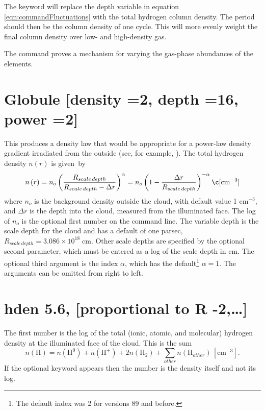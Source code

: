The keyword  will replace
the depth variable in equation \ref{eqn:commandFluctuations} with
the total hydrogen column density.
The period should then be the column
density of one cycle.
This will more evenly weight the final column density
over low- and high-density gas.

The  command proves a mechanism
for varying the gas-phase abundances of the elements.

\section{Globule [density =2, depth =16, power =2]}

This produces a density law that would be appropriate for a power-law
density gradient irradiated from the outside (see, for example, \citealp{Williams1992}).  The total hydrogen density $n(r)$ is given~by
\begin{equation}
n\left( r \right) = n_{\mathrm{o}} \left( {\frac{{R_{scale\,depth}
}}{{R_{scale\,depth}  - \Delta r}}} \right)^\alpha   = n_o \left( {1 -
\frac{{\Delta r}}{{R_{scale\,depth} }}} \right)^{ - \alpha }
\c[\mathrm{cm}^{-3}]%
\end{equation}
where $n_o$ is the background density outside the cloud,
with default value
1 cm$^{-3}$, and $\Delta r$ is the depth into the cloud,
measured from the illuminated face.
The log of $n_o$ is the optional first number on the command line.
The variable  depth is the scale depth
for the cloud and has a default
of one parsec, $R_{scale\, depth} = 3.086\times 10^{18} \; \mathrm{cm}$.
Other scale depths are specified
by the optional second parameter, which must be entered as a log of the
scale depth in cm.
The optional third argument is the index $\alpha$, which has
the default\footnote{The default index was 2 for versions 89 and before.} $\alpha = 1$. The arguments can be omitted from right to left.

\section{hden 5.6, [proportional to R -2,\dots]}

The first number is the log of the total (ionic, atomic, and molecular)
hydrogen density at the illuminated face of the cloud.
This is the sum
\begin{equation}
n\left( {\mathrm{H}} \right) = n\left( {{\mathrm{H}}^{\mathrm{0}} } \right) + n\left(
{{\mathrm{H}}^ +  } \right) + 2n\left( {{\mathrm{H}}_2 } \right) +
\sum\limits_{other} {n\left( {{\mathrm{H}}_{other}^{} } \right)}
\, [\mathrm{cm}^{-3}] .%
\end{equation}
If the optional keyword  appears then
the number is the density itself and not its log.

